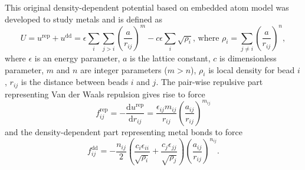 This original density-dependent potential based on embedded atom model was
developed to study metals\cite{sutton1990} and is defined as
\begin{equation}\label{eq:SuttonChen}
  U = u^\text{rep} + u^\text{dd} = \epsilon\sum_i\sum_{j>i}
    \left(\frac{a}{r_{ij}}\right)^m-c\epsilon\sum_i\sqrt{\rho_i}
    \mbox{, where }
    \rho_i=\sum_{j\neq i}\left(\frac{a}{r_{ij}}\right)^n,
\end{equation}
where $\epsilon$ is an energy parameter, $a$ is the lattice constant, $c$ is
dimensionless parameter, $m$ and $n$ are integer parameters ($m>n$), $\rho_i$ is
local density for bead $i$, $r_{ij}$ is the distance between beads $i$ and $j$.
The pair-wise repulsive part representing Van der Waals repulsion gives rise to
force
\begin{equation}\label{eq:SCfrep}
f^\text{rep}_{ij} = -\frac{\text{d}u^\text{rep}}{\text{d}r_{ij}} =
  \frac{\epsilon_{ij}m_{ij}}{r_{ij}}\left(\frac{a_{ij}}{r_{ij}}\right)^{m_{ij}}
\end{equation}
and the density-dependent part representing metal bonds to force
\begin{equation}\label{eq:SCfdd}
f^\text{dd}_{ij} = -\frac{n_{ij}}{2}
  \left(\frac{c_i\epsilon_{ii}}{\sqrt{\rho_i}}+
        \frac{c_j\epsilon_{jj}}{\sqrt{\rho_j}}\right)
  \left(\frac{a_{ij}}{r_{ij}}\right)^{n_{ij}}.
\end{equation}

